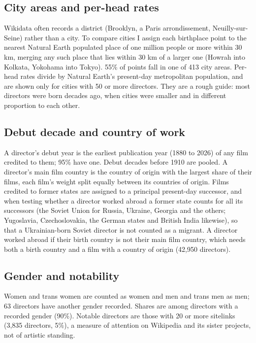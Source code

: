 \documentclass[11pt,a4paper]{article}
\begin{document}
\subsection{City areas and per-head rates}
Wikidata often records a district (Brooklyn, a Paris arrondissement, Neuilly-sur-Seine) rather than a city. To compare cities I assign each birthplace point to the nearest Natural Earth populated place of one million people or more within 30 km, merging any such place that lies within 30 km of a larger one (Howrah into Kolkata, Yokohama into Tokyo). 55\% of points fall in one of 413 city areas. Per-head rates divide by Natural Earth's present-day metropolitan population, and are shown only for cities with 50 or more directors. They are a rough guide: most directors were born decades ago, when cities were smaller and in different proportion to each other.

\subsection{Debut decade and country of work}
A director's debut year is the earliest publication year (1880 to 2026) of any film credited to them; 95\% have one. Debut decades before 1910 are pooled. A director's main film country is the country of origin with the largest share of their films, each film's weight split equally between its countries of origin. Films credited to former states are assigned to a principal present-day successor, and when testing whether a director worked abroad a former state counts for all its successors (the Soviet Union for Russia, Ukraine, Georgia and the others; Yugoslavia, Czechoslovakia, the German states and British India likewise), so that a Ukrainian-born Soviet director is not counted as a migrant. A director worked abroad if their birth country is not their main film country, which needs both a birth country and a film with a country of origin (42,950 directors).

\subsection{Gender and notability}
Women and trans women are counted as women and men and trans men as men; 63 directors have another gender recorded. Shares are among directors with a recorded gender (90\%). Notable directors are those with 20 or more sitelinks (3,835 directors, 5\%), a measure of attention on Wikipedia and its sister projects, not of artistic standing.
\end{document}
